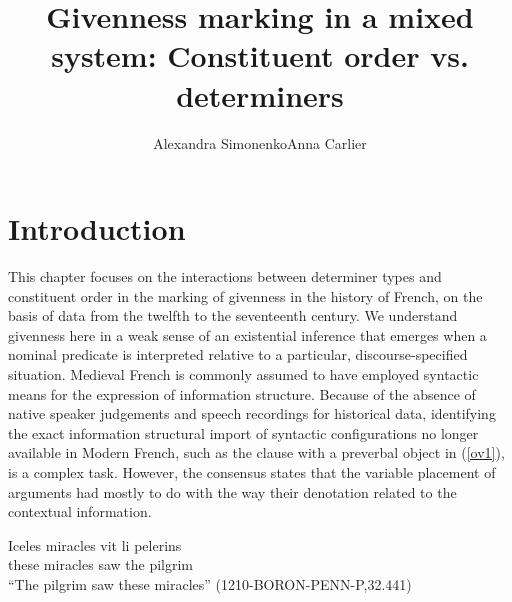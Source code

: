 \documentclass[output=paper,modfonts,nonflat]{langsci/langscibook}
\title{Givenness marking in a mixed system: Constituent order vs. determiners}
\author{Alexandra Simonenko\affiliation{Research Foundation Flanders \& Ghent University}\lastand Anna Carlier\affiliation{Université de Lille}}
\begin{document}
\maketitle
\section{Introduction} 

This chapter focuses on the interactions between determiner types and \linebreak constituent order in the marking of givenness in the history of French, on the basis of data from the twelfth to the seventeenth century. We understand givenness here in a weak sense of an existential inference that emerges when a nominal predicate is interpreted relative to a particular, discourse-specified situation. Medieval French is commonly assumed to have employed syntactic means for the expression of information structure. Because of the absence of native speaker judgements and speech recordings for historical data, identifying the exact information structural import of syntactic configurations no longer available in Modern French, such as the clause with a preverbal object in (\ref{ov1}), is a complex task. However, the consensus states that the variable placement of arguments had mostly to do with the way their denotation related to the contextual information.

\ea \label{ov1}
\gll Iceles miracles vit li pelerins\\
 these miracles saw the pilgrim\\
\glt ``The pilgrim saw these miracles'' \hfill (1210-BORON-PENN-P,32.441)\label{ex:ovs}
\z


\end{document}
